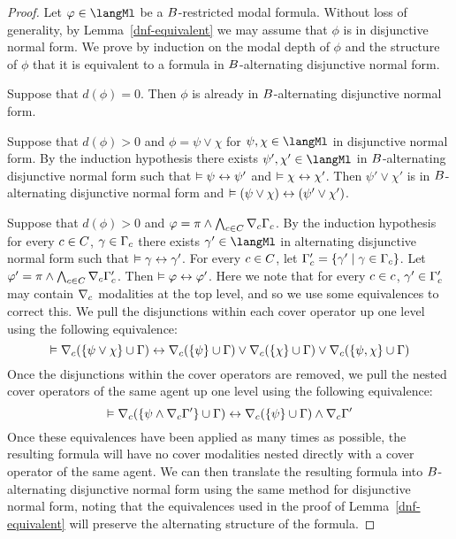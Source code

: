 \begin{proof}
Let $\phi \in \langMl$ be a $B$-restricted modal formula.
Without loss of generality, by Lemma~\ref{dnf-equivalent} we may assume that $\phi$ is in disjunctive normal form.
We prove by induction on the modal depth of $\phi$ and the structure of $\phi$ that it is equivalent to a formula in $B$-alternating disjunctive normal form.

Suppose that $d(\phi) = 0$. 
Then $\phi$ is already in $B$-alternating disjunctive normal form.

Suppose that $d(\phi) > 0$ and $\phi = \psi \lor \chi$ for $\psi, \chi \in \langMl$ in disjunctive normal form.
By the induction hypothesis there exists $\psi', \chi' \in \langMl$ in $B$-alternating disjunctive normal form such that $\vDash \psi \leftrightarrow \psi'$ and $\vDash \chi \leftrightarrow \chi'$.
Then $\psi' \lor \chi'$ is in $B$-alternating disjunctive normal form and $\vDash (\psi \lor \chi) \leftrightarrow (\psi' \lor \chi')$.

Suppose that $d(\phi) > 0$ and $\varphi = \pi \land \bigwedge_{c \in C} \nabla_{c} \Gamma_c$.
By the induction hypothesis for every $c \in C$, $\gamma \in \Gamma_c$ there exists $\gamma' \in \langMl$ in alternating disjunctive normal form such that $\vDash \gamma \leftrightarrow \gamma'$.
For every $c \in C$, let $\Gamma'_c = \{\gamma' \mid \gamma \in \Gamma_c\}$.
Let $\varphi' = \pi \land \bigwedge_{c \in C} \nabla_{c} \Gamma'_c$.
Then $\vDash \varphi \leftrightarrow \varphi'$.
Here we note that for every $c \in c$, $\gamma' \in \Gamma'_c$ may contain $\nabla_{c}$ modalities at the top level, and so we use some equivalences to correct this.
We pull the disjunctions within each cover operator up one level using the following equivalence:
$$
\vDash \nabla_{c} (\{\psi \lor \chi\} \cup \Gamma) \leftrightarrow \nabla_{c} (\{\psi\} \cup \Gamma) \lor \nabla_{c} (\{\chi\} \cup \Gamma) \lor \nabla_{c} (\{\psi, \chi\} \cup \Gamma)
$$
Once the disjunctions within the cover operators are removed, we pull the nested cover operators of the same agent up one level using the following equivalence:
$$
\vDash \nabla_{c} (\{\psi \land \nabla_{c} \Gamma'\} \cup \Gamma) \leftrightarrow \nabla_{c} (\{\psi\} \cup \Gamma) \land \nabla_{c} \Gamma'
$$
Once these equivalences have been applied as many times as possible, the resulting formula will have no cover modalities nested directly with a cover operator of the same agent.
We can then translate the resulting formula into $B$-alternating disjunctive normal form using the same method for disjunctive normal form, noting that the equivalences used in the proof of Lemma~\ref{dnf-equivalent} will preserve the alternating structure of the formula.
\end{proof}

